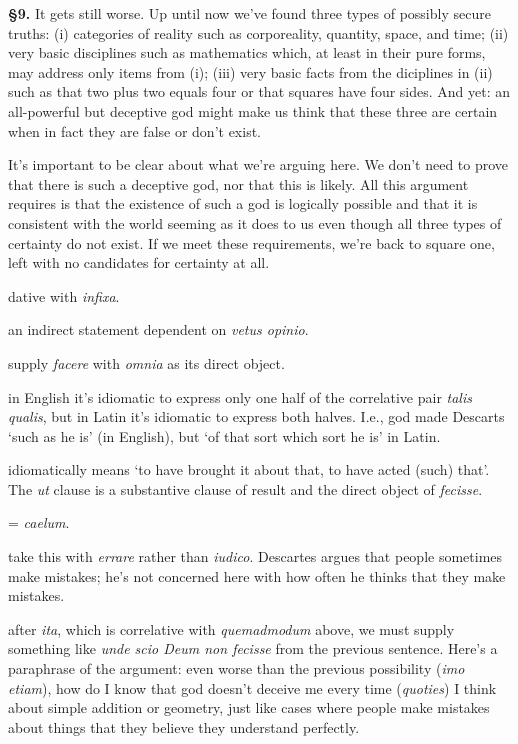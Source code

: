 \prenotes

\textbf{§9.} It gets still worse. Up until now we've found three types of possibly secure truths: (i) categories of reality such as corporeality, quantity, space, and time; (ii) very basic disciplines such as mathematics which, at least in their pure forms, may address only items from (i); (iii) very basic facts from the diciplines in (ii) such as that two plus two equals four or that squares have four sides. And yet: an all-powerful but deceptive god might make us think that these three are certain when in fact they are false or don't exist.

It's important to be clear about what we're arguing here. We don't need to prove that there is such a deceptive god, nor that this is likely. All this argument requires is that the existence of such a god is logically possible and that it is consistent with the world seeming as it does to us even though all three types of certainty do not exist. If we meet these requirements, we're back to square one, left with no candidates for certainty at all.

 dative with \textit{infixa}.

 an indirect statement dependent on \textit{vetus opinio}.

 supply \textit{facere} with \textit{omnia} as its direct object.

 in English it's idiomatic to express only one half of the correlative pair \textit{talis qualis}, but in Latin it's idiomatic to express both halves. I.e., god made Descarts `such as he is' (in English), but `of that sort which sort he is' in Latin.

 idiomatically means `to have brought it about that, to have acted (such) that'. The \textit{ut} clause is a substantive clause of result and the direct object of \textit{fecisse}.

 = \textit{caelum}.

 take this with \textit{errare} rather than \textit{iudico}. Descartes argues that people sometimes make mistakes; he's not concerned here with how often he thinks that they make mistakes.

 after \textit{ita}, which is correlative with \textit{quemadmodum} above, we must supply something like \textit{unde scio Deum non fecisse} from the previous sentence. Here's a paraphrase of the argument: even worse than the previous possibility (\textit{imo etiam}), how do I know that god doesn't deceive me every time (\textit{quoties}) I think about simple addition or geometry, just like cases where people make mistakes about things that they believe they understand perfectly.

